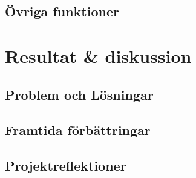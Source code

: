 \documentclass[a4paper]{article}
\begin{document}
\begin{multicols}{2}
\subsection{Övriga funktioner}

\section{Resultat \& diskussion}

        \subsection{Problem och Lösningar}

        \subsection{Framtida förbättringar}

        \subsection{Projektreflektioner}

    \nocite{*} %
    
    
\end{multicols}
\end{document}
